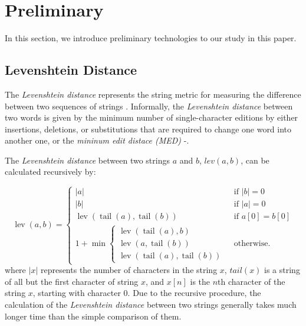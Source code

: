 \documentclass[technicalreport]{ieicej}
\begin{document}
\section{Preliminary}
\label{sec:preliminary}
    In this section, we introduce preliminary technologies to our study in this paper.

    \subsection{Levenshtein Distance}
        The {\em Levenshtein distance} represents the string metric for measuring the difference between two sequences of strings \cite{fuzzywuzzy-guidence}. Informally, the {\em Levenshtein distance} between two words is given by the minimum number of single-character editions by either insertions, deletions, or substitutions that are required to change one word into another one, or the {\em mininum edit distace (MED)} \cite{fuzzywuzzy-guidence}-\cite{levenshtein}.

        The {\em Levenshtein distance} between two strings $a$ and $b$, $lev(a, b)$, can be calculated recursively by:

        \begin{equation}
                \operatorname{lev}(a, b)=\left\{\begin{array}{ll}
                |a| & \text { if }|b|=0 \\
                |b| & \text { if }|a|=0 \\
                \operatorname{lev}(\operatorname{tail}(a), \operatorname{tail}(b)) & \text { if } a[0]=b[0] \\
                1+\min \left\{\begin{array}{l}
                \operatorname{lev}(\operatorname{tail}(a), b) \\
                \operatorname{lev}(a, \operatorname{tail}(b)) \\
                \operatorname{lev}(\operatorname{tail}(a), \operatorname{tail}(b))
                \end{array}\right. & \text { otherwise. }
                \end{array}\right.
        \end{equation}
        where $|x|$ represents the number of characters in the string $x$, $tail(x)$ is a string of all but the first character of string $x$, and $x[n]$ is the $n$th character of the string $x$, starting with character 0. Due to the recursive procedure, the calculation of the {\em Levenshtein distance} between two strings generally takes much longer time than the simple comparison of them.
\end{document}
